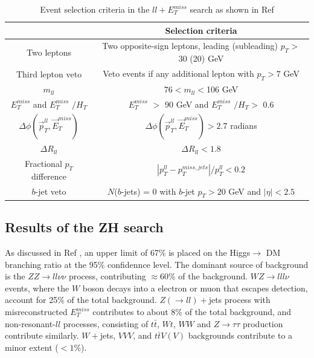 \documentclass[11pt,a4paper,openright,twoside]{report}
\newcommand{\ZZ}{$ZZ\to ll\nu\nu$ }
\newcommand{\met}{$E_T^{miss}$ }
\begin{document}
\begin{table}[H]
\centering
\begin{tabular}{c c}
\hline
\hline
& Selection criteria\\
\hline
Two leptons & Two opposite-sign leptons, leading (subleading) $p_T>$ 30 (20) GeV \\
\hline
Third lepton veto & Veto events if any additional lepton with $p_T>7$ GeV\\
\hline
$m_{ll}$ & 76$<m_{ll}<$106 GeV\\
\hline
\met and \met$/H_T$ & \met$>$ 90 GeV and \met$/H_T >$ 0.6\\
\hline
$\Delta\phi(\vec{p}_T^{ll},\vec{E}_T^{miss})$ & $\Delta\phi(\vec{p}_T^{ll},\vec{E}_T^{miss})>2.7$ radians\\
\hline
$\Delta R_{ll}$ & $\Delta R_{ll}<1.8$\\
\hline
Fractional $p_T$ difference & $\left| p_T^{ll} - p_T^{miss,jets}\right|/p_T^{ll}<0.2$\\
\hline
$b$-jet veto & $N$($b$-jets) = 0 with $b$-jet $p_T>20$ GeV and $|\eta|<2.5$\\
\hline
\hline
\end{tabular}
\caption{Event selection criteria in the $ll+$\met search as shown in Ref \cite{ZH_ATLAS}}
\label{table:event_selection}
\end{table}

\subsection{Results of the ZH search}
As discussed in Ref \cite{ZH_ATLAS}, an upper limit of 67\% is placed on the Higgs$\to$ DM branching ratio at the 95\% confidennce level. The dominant source of background is the \ZZ process, contributing $\approx 60\%$ of the background. $WZ\to lll\nu$ events, where the $W$ boson decays into a electron or muon that escapes detection, account for 25\% of the total background. $Z(\to ll)+$jets process with misreconstructed \met contributes to about 8\% of the total background, and non-resonant-$ll$ processes, consisting of $t\bar{t}$, $Wt$, $WW$ and $Z\to\tau\tau$ production contribute similarly. $W+$jets, $VVV$, and $t\bar{t}V(V)$ backgrounds contribute to a minor extent ($<1\%$).
\end{document}

